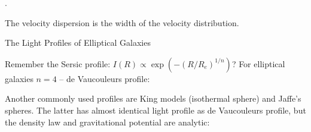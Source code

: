 \documentclass[letterpaper,landscape]{slides}
\begin{document}
\begin{slide}
	.
\begin{center}
\vskip 1in
\end{center}

\begin{center}
\vskip 0.1in
The {\color{blue} velocity dispersion} is the width of the velocity distribution.
\end{center}

\vfill
\end{slide}



%
%
%
%

\begin{slide}
\begin{center}
{\large \color{red} 
           The Light Profiles of Elliptical Galaxies }
\end{center}




Remember the Sersic profile: $I(R) \propto \exp(-(R/R_e)^{1/n})$?
For elliptical galaxies $n=4$ -- de Vaucouleurs profile:

Another commonly used profiles are King models (isothermal sphere)
and Jaffe's spheres. The latter has almost identical light profile
as de Vaucouleurs profile, but the density law and gravitational 
potential are analytic:


\vfill
\end{slide}

\end{document}
